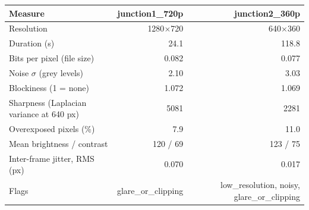 \begin{tabular}{@{}lrr@{}}
\toprule
Measure & junction1\_720p & junction2\_360p \\
\midrule
Resolution & 1280$\times$720 & 640$\times$360 \\
Duration (s) & 24.1 & 118.8 \\
Bits per pixel (file size) & 0.082 & 0.077 \\
Noise $\sigma$ (grey levels) & 2.10 & 3.03 \\
Blockiness (1 = none) & 1.072 & 1.069 \\
Sharpness (Laplacian variance at 640 px) & 5081 & 2281 \\
Overexposed pixels (\%) & 7.9 & 11.0 \\
Mean brightness / contrast & 120 / 69 & 123 / 75 \\
Inter-frame jitter, RMS (px) & 0.070 & 0.017 \\
Flags & glare\_or\_clipping & low\_resolution, noisy, glare\_or\_clipping \\
\bottomrule
\end{tabular}
